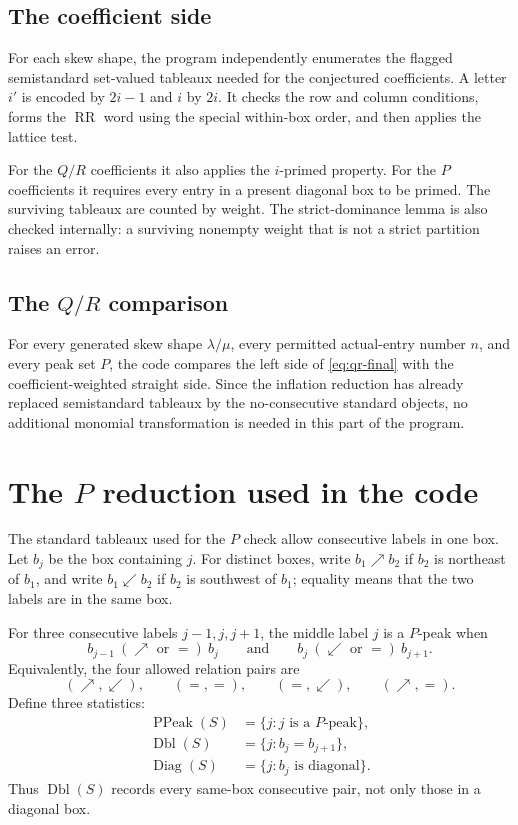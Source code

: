 \documentclass[11pt]{article}
\theoremstyle{definition}
\theoremstyle{remark}
\newcommand{\PPeak}{\operatorname{PPeak}}
\newcommand{\Dbl}{\operatorname{Dbl}}
\newcommand{\Diag}{\operatorname{Diag}}
\newcommand{\RR}{\operatorname{RR}}
\begin{document}
\subsection{The coefficient side}

For each skew shape, the program independently enumerates the flagged
semistandard set-valued tableaux needed for the conjectured coefficients.  A
letter $i'$ is encoded by $2i-1$ and $i$ by $2i$.  It checks the row and column
conditions, forms the $\RR$ word using the special within-box order, and then
applies the lattice test.

For the $Q/R$ coefficients it also applies the $i$-primed property.  For the
$P$ coefficients it requires every entry in a present diagonal box to be
primed.  The surviving tableaux are counted by weight.  The strict-dominance
lemma is also checked internally: a surviving nonempty weight that is not a
strict partition raises an error.

\subsection{The $Q/R$ comparison}

For every generated skew shape $\lambda/\mu$, every permitted actual-entry
number $n$, and every peak set $P$, the code compares the left side of
\eqref{eq:qr-final} with the coefficient-weighted straight side.  Since the
inflation reduction has already replaced semistandard tableaux by the
no-consecutive standard objects, no additional monomial transformation is
needed in this part of the program.

\section{The $P$ reduction used in the code}
\label{sec:p-reduction}

The standard tableaux used for the $P$ check allow consecutive labels in one
box.  Let $b_j$ be the box containing $j$.  For distinct boxes, write
$b_1\nearrow b_2$ if $b_2$ is northeast of $b_1$, and write
$b_1\swarrow b_2$ if $b_2$ is southwest of $b_1$; equality means that the two
labels are in the same box.

For three consecutive labels $j-1,j,j+1$, the middle label $j$ is a
$P$-peak when
\[
  b_{j-1}\ (\nearrow\text{ or }=)\ b_j
  \qquad\text{and}\qquad
  b_j\ (\swarrow\text{ or }=)\ b_{j+1}.
\]
Equivalently, the four allowed relation pairs are
\[
  (\nearrow,\swarrow),\qquad (=,=),\qquad (=,\swarrow),
  \qquad(\nearrow,=).
\]
Define three statistics:
\begin{align*}
  \PPeak(S)&=\{j:j\text{ is a $P$-peak}\},\\
  \Dbl(S)&=\{j:b_j=b_{j+1}\},\\
  \Diag(S)&=\{j:b_j\text{ is diagonal}\}.
\end{align*}
Thus $\Dbl(S)$ records every same-box consecutive pair, not only those in a
diagonal box.
\end{document}
